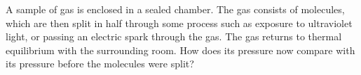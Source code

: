 A sample of gas is enclosed in a sealed chamber. The gas consists of
molecules, which are then split in half through some process such as
exposure to ultraviolet light, or passing an electric spark through the
gas. The gas returns to thermal equilibrium with the surrounding
room. How does its pressure now compare with its pressure before the
molecules were split?
